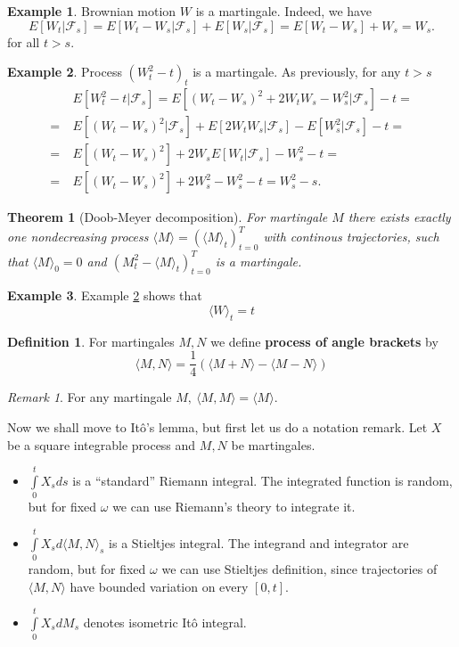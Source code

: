 \documentclass[a4paper,12pt]{article}
\newtheorem{thm}{Theorem}[section]
\theoremstyle{definition}
\newtheorem{mydef}{Definition}[section]
\newtheorem{example}{Example}[section]
\theoremstyle{remark}
\newtheorem{remark}{Remark}
\begin{document}
\begin{example}
 Brownian motion $W$ is a martingale. Indeed, we have
 \begin{equation*}
  E[W_t|\mathcal{F}_s] = E[W_t-W_s|\mathcal{F}_s] + E[W_s|\mathcal{F}_s] = E[W_t-W_s] + W_s = W_s.
 \end{equation*}
 for all $t > s$.
\end{example}
\begin{example}
 \label{ex:angleWt}
 Process $(W_t^2-t)_t$ is a martingale. As previously, for any $t > s$
 \begin{equation*}
  \begin{split}
       & E[W_t^2-t|\mathcal{F}_s] = E[(W_t-W_s)^2 + 2W_tW_s - W_s^2|\mathcal{F}_s] -t =\\ 
    =\ & E[(W_t-W_s)^2|\mathcal{F}_s] + E[2W_tW_s|\mathcal{F}_s] - E[W_s^2|\mathcal{F}_s] -t = \\
    =\ & E[(W_t-W_s)^2] + 2W_sE[W_t|\mathcal{F}_s] - W_s^2 -t = \\
    =\ & E[(W_t-W_s)^2] + 2W_s^2 - W_s^2 -t = W_s^2 - s.
  \end{split}
 \end{equation*}
\end{example}

\begin{thm}[Doob-Meyer decomposition]
 For martingale $M$ there exists exactly one nondecreasing process $\langle M\rangle = (\langle M\rangle_t)_{t=0}^T$ with continous trajectories, such that $\langle M\rangle_0 = 0$ and $(M_t^2 - \langle M\rangle_t)_{t=0}^T$ is a martingale.
\end{thm}

\begin{example}
 Example \ref{ex:angleWt} shows that \[\langle W\rangle_t = t\]
\end{example}

\begin{mydef}
 For martingales $M,N$ we define \textbf{process of angle brackets} by
 \[\langle M,N\rangle = \frac{1}{4}(\langle M+N\rangle - \langle M-N\rangle)\]
\end{mydef}

\begin{remark}
 For any martingale $M,\ \langle M,M\rangle = \langle M\rangle$.
\end{remark}

\noindent Now we shall move to It\^{o}'s lemma, but first let us do a notation remark. Let $X$ be a square integrable process and $M,N$ be martingales.
\begin{itemize}
 \item $\int\limits_0^t X_s ds$ is a ``standard'' Riemann integral. The integrated function is random, but for fixed $\omega$ we can use Riemann's theory to integrate it.
 \item $\int\limits_0^t X_s d\langle M,N\rangle_s$ is a Stieltjes integral. The integrand and integrator are random, but for fixed $\omega$ we can use Stieltjes definition, since trajectories of $\langle M,N\rangle$ have bounded variation on every $[0,t]$.
 \item $\int\limits_0^t X_s dM_s$ denotes isometric It\^{o} integral.
\end{itemize}
\end{document}
